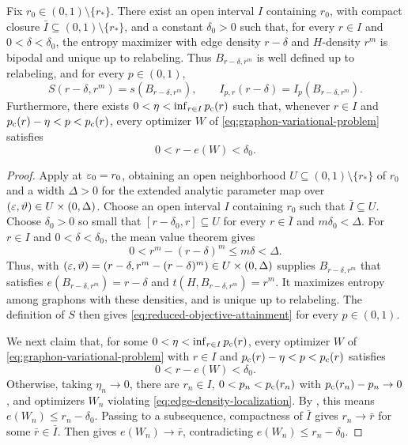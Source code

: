 \begin{lemma}\label{lem:fixed-density-bipodality}
Fix $r_0\in(0,1)\setminus\{r_*\}$.
There exist an open interval $I$ containing $r_0$, with compact closure
$\bar I \subseteq (0,1)\setminus\{r_*\}$, and a constant $\delta_0>0$ such that,
for every $r\in I$ and $0<\delta<\delta_0$, the entropy maximizer with edge density
$r-\delta$ and $H$-density $r^m$ is bipodal and unique up to relabeling.
Thus $B_{r-\delta,r^m}$ is well defined up to relabeling, and for every $p\in(0,1)$,
\begin{equation}\label{eq:reduced-objective-attainment}
  S(r-\delta,r^m)=s(B_{r-\delta,r^m}),
  \qquad
  I_{p,r}(r-\delta)=I_p(B_{r-\delta,r^m}).
\end{equation}
Furthermore, there exists $0<\eta<\inf_{r\in I}p_{\mathrm c}(r)$ such that,
whenever $r\in I$ and $p_{\mathrm c}(r)-\eta<p<p_{\mathrm c}(r)$, every optimizer
$W$ of \eqref{eq:graphon-variational-problem} satisfies
\[
  0<r-e(W)<\delta_0.
\]
\end{lemma}

\begin{proof}
Apply  at $\varepsilon_0=r_0$, obtaining
an open neighborhood $U \subseteq (0,1)\setminus\{r_*\}$ of $r_0$ and a width $\Delta>0$
for the extended analytic parameter map over
$(\varepsilon, \vartheta) \in U \times (0,\Delta)$.
Choose an open interval $I$ containing $r_0$ such that $\bar I \subseteq U$.
Choose $\delta_0>0$ so small that
$[r-\delta_0,r]\subseteq U$ for every $r\in\bar I$ and
$m\delta_0<\Delta$.
For $r\in I$ and $0<\delta<\delta_0$, the mean value theorem gives
\[
  0<r^m-(r-\delta)^m\le m\delta<\Delta.
\]
Thus,  with
$(\varepsilon,\vartheta)=(r-\delta,r^m-(r-\delta)^m) \in U \times (0,\Delta)$
supplies $B_{r-\delta,r^m}$ that satisfies
$e(B_{r-\delta,r^m})=r-\delta$ and $t(H,B_{r-\delta,r^m})=r^m$.
It maximizes entropy among graphons with these densities,
and is unique up to relabeling.  The definition of $S$ then gives
\eqref{eq:reduced-objective-attainment} for every $p\in(0,1)$.

We next claim that, for some
$0<\eta<\inf_{r\in I}p_{\mathrm c}(r)$, every optimizer
$W$ of \eqref{eq:graphon-variational-problem} with
$r\in I$ and $p_{\mathrm c}(r)-\eta<p<p_{\mathrm c}(r)$ satisfies
\begin{equation}\label{eq:edge-density-localization}
  0<r-e(W)<\delta_0.
\end{equation}
Otherwise, taking $\eta_n\to0$, there
are $r_n\in I$, $0<p_n<p_{\mathrm c}(r_n)$ with $p_{\mathrm c}(r_n)-p_n\to0$, and optimizers
$W_n$ violating \eqref{eq:edge-density-localization}.
By , this means $e(W_n)\le r_n-\delta_0$.
Passing to a subsequence, compactness of $\bar I$ gives
$r_n\to\bar r$ for some $\bar r\in\bar I$.
Then  gives $e(W_n)\to\bar r$,
contradicting $e(W_n)\le r_n-\delta_0$.
\end{proof}

